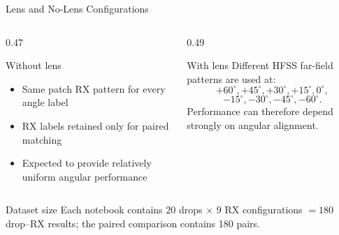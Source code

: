 \begin{frame}[t,shrink=15]{Lens and No-Lens Configurations}
    \begin{columns}[T,onlytextwidth]
        \begin{column}{0.47\textwidth}
            \begin{block}{Without lens}
                \begin{itemize}
                    \item Same patch RX pattern for every angle label
                    \item RX labels retained only for paired matching
                    \item Expected to provide relatively uniform angular
                    performance
                \end{itemize}
            \end{block}
        \end{column}
        \begin{column}{0.49\textwidth}
            \begin{block}{With lens}
                Different HFSS far-field patterns are used at:
                \[
                    +60^\circ,+45^\circ,+30^\circ,+15^\circ,0^\circ,
                \]
                \[
                    -15^\circ,-30^\circ,-45^\circ,-60^\circ.
                \]
                Performance can therefore depend strongly on angular
                alignment.
            \end{block}
        \end{column}
    \end{columns}
    \begin{exampleblock}{Dataset size}
        Each notebook contains $20$ drops $\times$ $9$ RX configurations
        $=180$ drop--RX results; the paired comparison contains 180 pairs.
    \end{exampleblock}
\end{frame}

